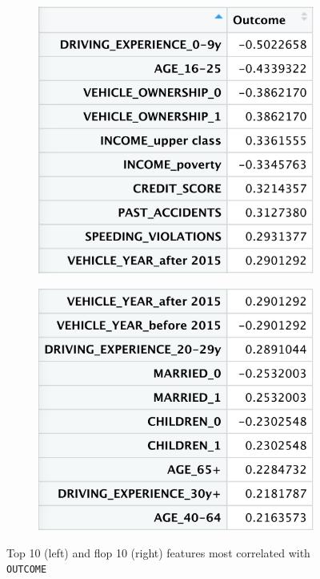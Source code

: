 \documentclass[a4paper,11pt, titlepage]{article}
\begin{document}
\begin{figure}[h!]
    \centering
    \begin{subfigure}
    \centering
    \includegraphics[scale=0.3]{correlations-top10.png}
    \end{subfigure}
    \hskip50pt
    \begin{subfigure}
        \centering
        \includegraphics[scale=0.33]{correlations-flop10.png}
    \end{subfigure}
    \caption{\centering Top 10 (left) and flop 10 (right) features most correlated with {\tt OUTCOME}}
    \label{fig:corr}
\end{figure}
\end{document}
